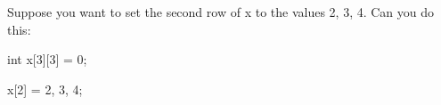 \begin{ex}
Suppose you want to set the second row of x to the values 2, 3, 4. Can you do this:

\begin{consolethree}
int x[3][3] = {{0}};

x[2] = {2, 3, 4};
\end{consolethree}
\end{ex}
